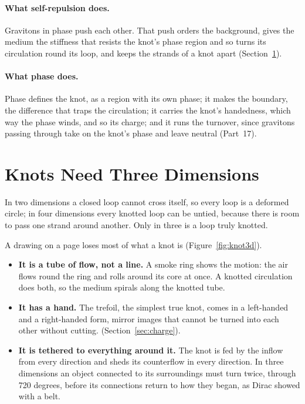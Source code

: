 \documentclass[11pt,a4paper]{article}
\begin{document}
\paragraph{What self-repulsion does.} Gravitons in phase push each other. That push orders the background, gives the medium the stiffness that resists the knot's phase region and so turns its circulation round its loop, and keeps the strands of a knot apart (Section~\ref{sec:three}).

\paragraph{What phase does.} Phase defines the knot, as a region with its own phase; it makes the boundary, the difference that traps the circulation; it carries the knot's handedness, which way the phase winds, and so its charge; and it runs the turnover, since gravitons passing through take on the knot's phase and leave neutral (Part~17).


\section{Knots Need Three Dimensions}
\label{sec:three}

 In two dimensions a closed loop cannot cross itself, so every loop is a deformed circle; in four dimensions every knotted loop can be untied, because there is room to pass one strand around another. Only in three is a loop truly knotted. 

A drawing on a page loses most of what a knot is (Figure~\ref{fig:knot3d}).
\begin{itemize}
\item \textbf{It is a tube of flow, not a line.} A smoke ring shows the motion: the air flows round the ring and rolls around its core at once. A knotted circulation does both, so the medium spirals along the knotted tube.
\item \textbf{It has a hand.} The trefoil, the simplest true knot, comes in a left-handed and a right-handed form, mirror images that cannot be turned into each other without cutting.  (Section~\ref{sec:charge}).
\item \textbf{It is tethered to everything around it.} The knot is fed by the inflow from every direction and sheds its counterflow in every direction. In three dimensions an object connected to its surroundings must turn twice, through 720 degrees, before its connections return to how they began, as Dirac showed with a belt. 
\end{itemize}
\end{document}
